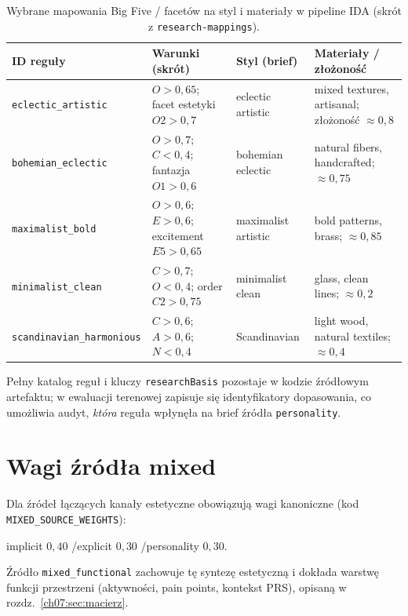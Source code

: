 \begin{table}[htbp]
  \centering
  \caption{Wybrane mapowania Big Five / facetów na styl i materiały w pipeline IDA (skrót z \texttt{research-mappings}).}
  \label{tab:app:c:mappings}
  \begin{tabular}{@{}p{}p{}p{}p{}@{}}
    \toprule
    ID reguły & Warunki (skrót) & Styl (brief) & Materiały / złożoność \\
    \midrule
    \texttt{eclectic\_artistic} &
    $O>0{,}65$; facet estetyki $O2>0{,}7$ &
    eclectic artistic &
    mixed textures, artisanal; złożoność $\approx 0{,}8$ \\
    \addlinespace
    \texttt{bohemian\_eclectic} &
    $O>0{,}7$; $C<0{,}4$; fantazja $O1>0{,}6$ &
    bohemian eclectic &
    natural fibers, handcrafted; $\approx 0{,}75$ \\
    \addlinespace
    \texttt{maximalist\_bold} &
    $O>0{,}6$; $E>0{,}6$; excitement $E5>0{,}65$ &
    maximalist artistic &
    bold patterns, brass; $\approx 0{,}85$ \\
    \addlinespace
    \texttt{minimalist\_clean} &
    $C>0{,}7$; $O<0{,}4$; order $C2>0{,}75$ &
    minimalist clean &
    glass, clean lines; $\approx 0{,}2$ \\
    \addlinespace
    \texttt{scandinavian\_harmonious} &
    $C>0{,}6$; $A>0{,}6$; $N<0{,}4$ &
    Scandinavian &
    light wood, natural textiles; $\approx 0{,}4$ \\
    \bottomrule
  \end{tabular}
\end{table}

Pełny katalog reguł i kluczy \texttt{researchBasis} pozostaje w kodzie źródłowym artefaktu; w ewaluacji terenowej zapisuje się identyfikatory dopasowania, co umożliwia audyt, \emph{która} reguła wpłynęła na brief źródła \texttt{personality}.

\section{Wagi źródła mixed}
\label{app:c:sec:wagi}

Dla źródeł łączących kanały estetyczne obowiązują wagi kanoniczne (kod \texttt{MIXED\_SOURCE\_WEIGHTS}):

\begin{center}
implicit $0{,}40$ \quad/\quad explicit $0{,}30$ \quad/\quad personality $0{,}30$.
\end{center}

Źródło \texttt{mixed\_functional} zachowuje tę syntezę estetyczną i dokłada warstwę funkcji przestrzeni (aktywności, pain points, kontekst PRS), opisaną w rozdz.~\ref{ch07:sec:macierz}.
